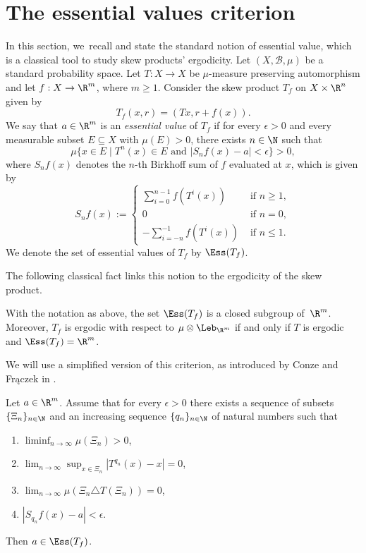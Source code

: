 \section{The essential values criterion}
In this section, we~recall and state the standard notion of essential value, which is a classical tool to study skew products' ergodicity. Let $(X,\mathcal B, \mu)$ be a standard probability space. Let $T:X\to X$ be $\mu$-measure preserving automorphism and let $f:X\to \R^m$, where $m \geq 1$. Consider the skew product $T_f$ on $X\times \R^n$ given by
\[
T_f(x,r)=(Tx,r+f(x)).
\]
We say that $a\in\R^m$ is an \emph{essential value} of $T_f$ if for every $\epsilon>0$ and every measurable subset $E\subseteq X$ with $\mu(E)>0$, there exists $n\in\N$ such that
\[
\mu\{x\in E\mid T^{n}(x)\in E\text{ and }|S_n f(x)-a|<\epsilon\}>0,
\]
where $S_n f (x)$ denotes the $n$-th Birkhoff sum of $f$ evaluated at $x$, which is given by
\begin{equation}
\label{eq:Birkhoff_sums}
S_n f (x):=\begin{cases}
\sum_{i=0}^{n-1}f(T^{i}(x))& \text{ if }n\ge 1,\\
0&\text{ if }n=0,\\
-\sum_{i=-n}^{-1}f(T^{i}(x))&\text{ if }n\le 1.
\end{cases}
\end{equation}
We denote the set of essential values of $T_f$ by $\Ess(T_f)$.

The following classical fact links this notion to the ergodicity of the skew product.
\begin{theorem}\label{thm: essvalues}
With the notation as above, the set $\Ess(T_f)$ is a closed subgroup of~$\R^m$. Moreover, $T_f$ is ergodic with respect to $\mu\otimes \Leb_{\R^m}$ if and only if $T$ is ergodic and $\Ess(T_f)=\R^m$.
\end{theorem}
We will use a simplified version of this criterion, as introduced by Conze and Frączek in
\cite{conze_cocycles_2011}.

\begin{theorem}\label{thm: FUcriterion}
Let $a\in\R^m$. Assume that for every $\epsilon>0$ there exists a sequence
of subsets $\{\Xi_n\}_{n\in\N}$ and an increasing sequence
$\{q_n\}_{n\in\N}$ of natural numbers such that
\begin{enumerate}
\item \label{cond:measure} $\liminf_{n\to\infty}\mu(\Xi_n)>0$,
\item \label{cond:rigidity}$\lim_{n\to\infty}\sup_{x\in \Xi_n}|T^{q_n}(x)-x|=0$,
\item \label{cond:almost_invariant} $\lim_{n\to\infty}\mu(\Xi_n\triangle T(\Xi_n))=0$,
\item \label{cond:BS} $|S_{q_n}f(x)-a|<\epsilon$.
\end{enumerate}
Then $a\in \Ess(T_f)$.
\end{theorem}


